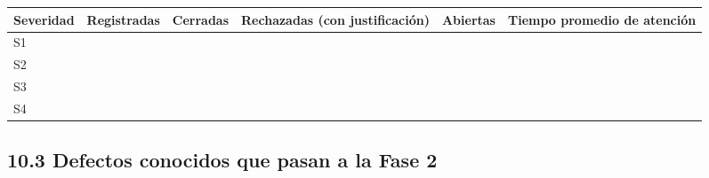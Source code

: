 {\def\LTcaptype{none} %
\begin{longtable}[]{@{}
  >{\raggedright\arraybackslash}p{}
  >{\raggedright\arraybackslash}p{}
  >{\raggedright\arraybackslash}p{}
  >{\raggedright\arraybackslash}p{}
  >{\raggedright\arraybackslash}p{}
  >{\raggedright\arraybackslash}p{}@{}}
\toprule\noalign{}
\begin{minipage}[b]{\linewidth}\raggedright
\textbf{Severidad}
\end{minipage} & \begin{minipage}[b]{\linewidth}\raggedright
\textbf{Registradas}
\end{minipage} & \begin{minipage}[b]{\linewidth}\raggedright
\textbf{Cerradas}
\end{minipage} & \begin{minipage}[b]{\linewidth}\raggedright
\textbf{Rechazadas (con justificación)}
\end{minipage} & \begin{minipage}[b]{\linewidth}\raggedright
\textbf{Abiertas}
\end{minipage} & \begin{minipage}[b]{\linewidth}\raggedright
\textbf{Tiempo promedio de atención}
\end{minipage} \\
\midrule\noalign{}
\endhead
\bottomrule\noalign{}
\endlastfoot
S1 & & & & & \\
S2 & & & & & \\
S3 & & & & & \\
S4 & & & & & \\
\end{longtable}
}

\subsection{10.3 Defectos conocidos que pasan a la Fase
2}\label{defectos-conocidos-que-pasan-a-la-fase-2}

